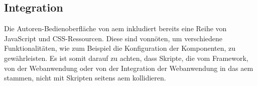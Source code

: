 \subsection{Integration}

Die Autoren-Bedienoberfläche von \ac{aem} inkludiert bereits eine Reihe von JavaScript und CSS-Ressourcen. Diese sind vonnöten, um verschiedene Funktionalitäten, wie zum Beispiel die Konfiguration der Komponenten, zu gewährleisten. Es ist somit darauf zu achten, dass Skripte, die vom Framework, von der Webanwendung oder von der Integration der Webanwendung in das \ac{aem} stammen, nicht mit Skripten seitens \ac{aem} kollidieren.